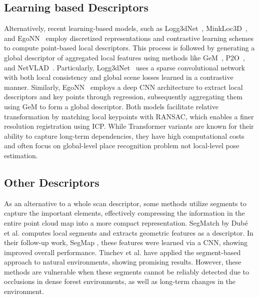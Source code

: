 \subsection*{Learning based Descriptors} 
Alternatively, recent learning-based models, such as Logg3dNet~\cite{vidanapathirana2022icra}, MinkLoc3D~\cite{komorowski2021wacv}, and EgoNN~\cite{komorowski2022ral} employ discretized representations and contrastive learning schemes to compute point-based local descriptors. This process is followed by generating a global descriptor of aggregated local features using methods like GeM~\cite{radenovic2019pami}, P2O~\cite{vidanapathirana2021icra}, and NetVLAD~\cite{arandjelovic2018pami}.  
Particularly, Logg3dNet~\cite{vidanapathirana2022icra} uses a sparse convolutional network with both local consistency and global scene losses learned in a contrastive manner. Similarly, EgoNN~\cite{komorowski2022ral} employs a deep CNN architecture to extract local descriptors and key points through regression, subsequently aggregating them using GeM to form a global descriptor.
Both models facilitate relative transformation by matching local keypoints with RANSAC, which enables a finer resolution registration using ICP. 
While Transformer variants \cite{zhang2019cvpr, xia2021cvpr, zhou2021icra, xu2021transloc3d} are known for their ability to capture long-term dependencies, they have high computational costs and often focus on global-level place recognition problem not local-level pose estimation.

\subsection*{Other Descriptors} 
As an alternative to a whole scan descriptor, some methods utilize segments to capture the important elements, effectively compressing the information in the entire point cloud map into a more compact representation. SegMatch \cite{dube2017icra} by Dubé et al. computes local segments and extracts geometric features as a descriptor. In their follow-up work, SegMap \cite{dube2018rss}, these features were learned via a CNN, showing improved overall performance. Tinchev et al. \cite{tinchev2018iros, tinchev2019ral} have applied the segment-based approach to natural environments, showing promising results. However, these methods are vulnerable when these segments cannot be reliably detected due to occlusions in dense forest environments, as well as long-term changes in the environment.


